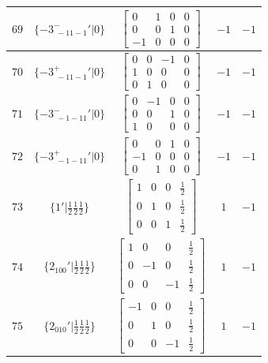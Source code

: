 \documentclass[fleqn,8pt]{jsarticle}
\begin{document}
\begin{longtable}{ccccc}
$ 69 $ & $ \{-3^{-}_{\,\,-11-1}{}'|0\} $ & $ \begin{bmatrix} 0 & 1 & 0 & 0 \\ 0 & 0 & 1 & 0 \\ -1 & 0 & 0 & 0 \end{bmatrix} $ & $ -1 $ & $ -1 $ \\ \hline
$ 70 $ & $ \{-3^{+}_{\,\,-11-1}{}'|0\} $ & $ \begin{bmatrix} 0 & 0 & -1 & 0 \\ 1 & 0 & 0 & 0 \\ 0 & 1 & 0 & 0 \end{bmatrix} $ & $ -1 $ & $ -1 $ \\ \hline
$ 71 $ & $ \{-3^{-}_{\,\,-1-11}{}'|0\} $ & $ \begin{bmatrix} 0 & -1 & 0 & 0 \\ 0 & 0 & 1 & 0 \\ 1 & 0 & 0 & 0 \end{bmatrix} $ & $ -1 $ & $ -1 $ \\ \hline
$ 72 $ & $ \{-3^{+}_{\,\,-1-11}{}'|0\} $ & $ \begin{bmatrix} 0 & 0 & 1 & 0 \\ -1 & 0 & 0 & 0 \\ 0 & 1 & 0 & 0 \end{bmatrix} $ & $ -1 $ & $ -1 $ \\ \hline
$ 73 $ & $ \{1{}'|\frac{1}{2} \frac{1}{2} \frac{1}{2}\} $ & $ \begin{bmatrix} 1 & 0 & 0 & \frac{1}{2} \\ 0 & 1 & 0 & \frac{1}{2} \\ 0 & 0 & 1 & \frac{1}{2} \end{bmatrix} $ & $ 1 $ & $ -1 $ \\ \hline
$ 74 $ & $ \{2{}_{100}{}'|\frac{1}{2} \frac{1}{2} \frac{1}{2}\} $ & $ \begin{bmatrix} 1 & 0 & 0 & \frac{1}{2} \\ 0 & -1 & 0 & \frac{1}{2} \\ 0 & 0 & -1 & \frac{1}{2} \end{bmatrix} $ & $ 1 $ & $ -1 $ \\ \hline
$ 75 $ & $ \{2{}_{010}{}'|\frac{1}{2} \frac{1}{2} \frac{1}{2}\} $ & $ \begin{bmatrix} -1 & 0 & 0 & \frac{1}{2} \\ 0 & 1 & 0 & \frac{1}{2} \\ 0 & 0 & -1 & \frac{1}{2} \end{bmatrix} $ & $ 1 $ & $ -1 $ \\ \hline

\end{longtable}
\end{document}
